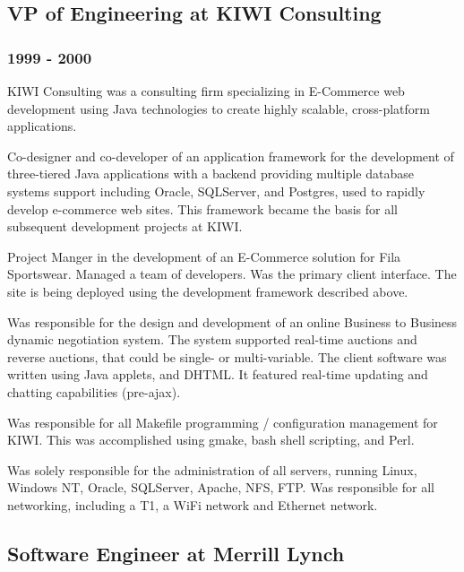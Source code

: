\documentclass[letterpaper]{article}
\begin{document}
\subsection{VP of Engineering at KIWI Consulting}
\label{sec-2-5}
\subsubsection{1999 - 2000}
\label{sec-2-5-1}
\vspace{0.1in}

KIWI Consulting was a consulting firm specializing in E-Commerce web
development using Java technologies to create highly scalable,
cross-platform applications.
\vspace{0.1in}

Co-designer and co-developer of an application framework for the
development of three-tiered Java applications with a backend providing
multiple database systems support including Oracle, SQLServer, and
Postgres, used to rapidly develop e-commerce web sites. This framework
became the basis for all subsequent development projects at KIWI.
\vspace{0.1in}

Project Manger in the development of an E-Commerce solution for Fila
Sportswear. Managed a team of developers. Was the primary client
interface. The site is being deployed using the development
framework described above.

\vspace{0.1in}
Was responsible for the design and development of an online Business
to Business dynamic negotiation system. The system supported real-time
auctions and reverse auctions, that could be single- or
multi-variable. The client software was written using Java applets,
and DHTML. It featured real-time updating and chatting capabilities
(pre-ajax). 
\vspace{0.1in}

Was responsible for all Makefile programming / configuration
management for KIWI. This was accomplished using gmake, bash shell
scripting, and Perl.

\vspace{0.1in}
Was solely responsible for the administration of all servers, running
Linux, Windows NT, Oracle, SQLServer, Apache, NFS, FTP. Was
responsible for all networking, including a T1, a WiFi network and
Ethernet network.

\subsection{Software Engineer at Merrill Lynch}
\label{sec-2-6}
\end{document}
